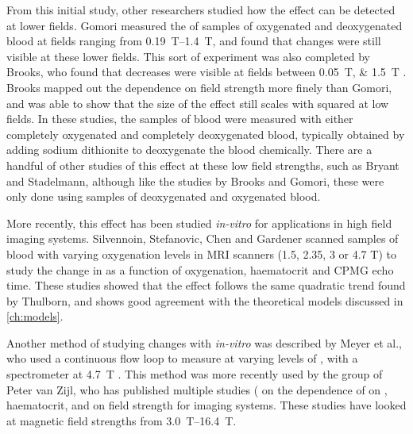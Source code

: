 From this initial study, other researchers studied how the effect can be detected at lower fields.
Gomori measured the \Ttwo of samples of oxygenated and deoxygenated blood at fields ranging from \SIrange{0.19}{1.4}{T}, and found that changes were still visible at these lower fields\cite{GomoriNMRRelaxationTimes1987}.
This sort of experiment was also completed by Brooks, who found that \Ttwo decreases were visible at fields between \SIlist{0.05;1.5}{T} \cite{BrooksComparisont2relaxation1995}.
Brooks mapped out the dependence on field strength more finely than Gomori, and was able to show that the size of the effect still scales with \Bzero squared at low fields.
In these studies, the samples of blood were measured with either completely oxygenated and completely deoxygenated blood, typically obtained by adding sodium dithionite to deoxygenate the blood chemically.
There are a handful of other studies of this effect at these low field strengths, such as Bryant\cite{BryantMagneticrelaxationblood1990} and Stadelmann\cite{StadelmannRelaxationtimesvenous1991}, although like the studies by Brooks and Gomori, these were only done using samples of deoxygenated and oxygenated blood.

More recently, this effect has been studied \textit{in-vitro} for applications in high field imaging systems.
Silvennoin\cite{SilvennoinenComparisondependenceblood2003}, Stefanovic\cite{StefanovicHumanwholebloodrelaxometry2004}, Chen\cite{ChenHumanwholeblood2009} and Gardener\cite{GardenerDependencebloodR22010} scanned samples of blood with varying oxygenation levels in MRI scanners (1.5, 2.35, 3 or 4.7 T) to study the change in \Ttwo as a function of oxygenation, haematocrit and CPMG echo time.
These studies showed that the effect follows the same quadratic trend found by Thulborn, and shows good agreement with the theoretical models discussed in \autoref{ch:models}.

Another method of studying \Ttwo changes with \SOtwo \textit{in-vitro} was described by Meyer et al., who used a continuous flow loop to measure \Ttwo at varying levels of \SOtwo, with a spectrometer at \SI{4.7}{T} \cite{MeyerNMRrelaxationrates1995}.
This method was more recently used by the group of Peter van Zijl, who has published multiple studies (\cite{ZhaoOxygenationhematocritdependence2007,GrgacTransversewaterrelaxation2017,QinDeterminationwholebrainoxygen2011} on the dependence of \Ttwo on \SOtwo, haematocrit, and on field strength for imaging systems.
These studies have looked at magnetic field strengths from \SIrange{3.0}{16.4}{T}.

